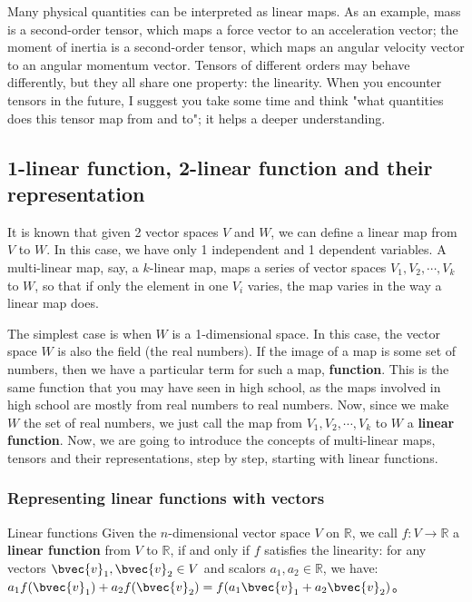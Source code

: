 Many physical quantities can be interpreted as linear maps. As an example, mass is a second-order tensor, which maps a force vector to an acceleration vector; the moment of inertia is a second-order tensor, which maps an angular velocity vector to an angular momentum vector. Tensors of different orders may behave differently, but they all share one property: the linearity. When you encounter tensors in the future, I suggest you take some time and think "what quantities does this tensor map from and to"; it helps a deeper understanding. 



\subsection{1-linear function, 2-linear function and their representation}

It is known that given 2 vector spaces $V$ and $W$, we can define a linear map from $V$ to $W$. In this case, we have only 1 independent and 1 dependent variables. A multi-linear map, say, a $k$-linear map, maps a series of vector spaces $V_1, V_2, \cdots, V_k$ to $W$, so that if only the element in one $V_i$ varies, the map varies in the way a linear map does. 

The simplest case is when $W$ is a 1-dimensional space. In this case, the vector space $W$ is also the field (the real numbers). If the image of a map is some set of numbers, then we have a particular term for such a map, \textbf{function}. This is the same function that you may have seen in high school, as the maps involved in high school are mostly from real numbers to real numbers. Now, since we make $W$ the set of real numbers, we just call the map from $V_1, V_2, \cdots, V_k$ to $W$ a \textbf{linear function}. Now, we are going to introduce the concepts of multi-linear maps, tensors and their representations, step by step, starting with linear functions. 

\subsubsection{Representing linear functions with vectors}

\begin{definition}{Linear functions}
Given the $n$-dimensional vector space $V$ on $\mathbb{R}$, we call $f:V\rightarrow \mathbb{R}$ a \textbf{linear function} from $V$ to $\mathbb{R}$, if and only if $f$ satisfies the linearity: for any vectors $\bvec{v}_1, \bvec{v}_2\in V$ and scalors $a_1, a_2\in\mathbb{R}$, we have: $a_1f(\bvec{v}_1)+a_2f(\bvec{v}_2)=f(a_1\bvec{v}_1+a_2\bvec{v}_2)$。

\end{definition}


